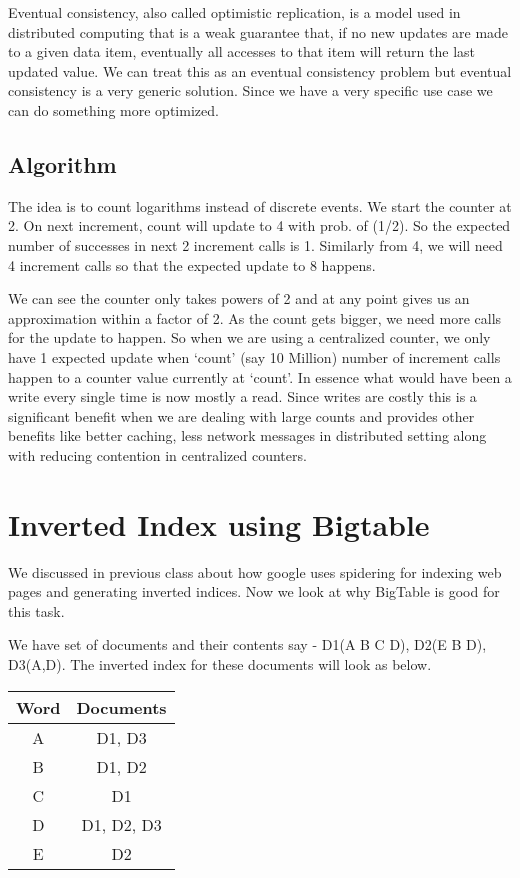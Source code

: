 \documentclass[twoside]{article}
\begin{document}
Eventual consistency, also called optimistic replication, is a model used in distributed computing that is a weak guarantee that, if no new updates are made to a given data item, eventually all accesses to that item will return the last updated value. We can treat this as an eventual consistency problem but eventual consistency is a very generic solution. Since we have a very specific use case we can do something more optimized.  
\subsection{Algorithm}
The idea is to count logarithms instead of discrete events. We start the counter at 2. On next increment, count will update to 4 with prob. of (1/2). So the expected number of successes in next 2 increment calls is 1. Similarly from 4, we will need 4 increment calls so that the expected update to 8 happens. 



We can see the counter only takes powers of 2 and at any point gives us an approximation within a factor of 2. 
As the count gets bigger, we need more calls for the update to happen. So when we are using a centralized counter, we only have 1 expected update when `count' (say 10 Million) number of increment calls happen to a counter value currently at `count'. In essence what would have been a write every single time is now mostly a read. Since writes are costly this is a significant benefit when we are dealing with large counts and provides other benefits like better caching, less network messages in distributed setting along with reducing contention in centralized counters.
\section{Inverted Index using Bigtable}
We discussed in previous class about how google uses spidering for indexing web pages and generating inverted indices. Now we look at why BigTable is good for this task.

We have set of documents and their contents say - D1(A B C D), D2(E B D), D3(A,D). The inverted index for these documents will look as below.

\begin{table}[h!]
\centering
\begin{tabular}{ c|c } 
Word & Documents\\
\hline
A & D1, D3\\
B & D1, D2\\
C & D1\\
D & D1, D2, D3\\
E & D2\\
\end{tabular}
\end{table}
\end{document}
